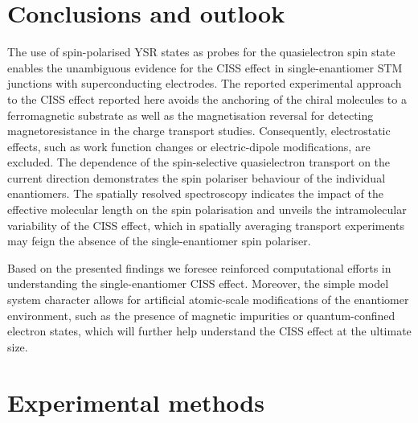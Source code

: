 \documentclass[aps,floatfix,12pt]{revtex4-2}
\begin{document}
\section*{Conclusions and outlook}

The use of spin-polarised YSR states as probes for the quasielectron spin state enables the unambiguous evidence for the CISS effect in single-enantiomer STM junctions with superconducting electrodes.
The reported experimental approach to the CISS effect reported here avoids the anchoring of the chiral molecules to a ferromagnetic substrate as well as the magnetisation reversal for detecting magnetoresistance in the charge transport studies.
Consequently, electrostatic effects, such as work function changes or electric-dipole modifications, are excluded.
The dependence of the spin-selective quasielectron transport on the current direction demonstrates the spin polariser behaviour of the individual enantiomers.
The spatially resolved spectroscopy indicates the impact of the effective molecular length on the spin polarisation and unveils the intramolecular variability of the CISS effect, which in spatially averaging transport experiments may feign the absence of the single-enantiomer spin polariser.

Based on the presented findings we foresee reinforced computational efforts in understanding the single-enantiomer CISS effect.
Moreover, the simple model system character allows for artificial atomic-scale modifications of the enantiomer environment, such as the presence of magnetic impurities or quantum-confined electron states, which will further help understand the CISS effect at the ultimate size.

\section*{Experimental methods}
\end{document}
